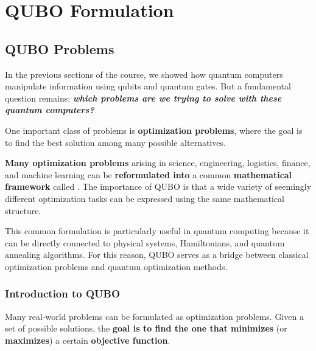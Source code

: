 \section{QUBO Formulation}\label{sec:qubo-formulation}

\subsection{QUBO Problems}\label{sec:qubo-problems}

In the previous sections of the course, we showed how quantum computers manipulate information using qubits and quantum gates. But a fundamental question remains: \emph{\textbf{which problems are we trying to solve with these quantum computers?}}

\highspace
One important class of problems is \textbf{optimization problems}, where the goal is to find the best solution among many possible alternatives.

\highspace
\textbf{Many optimization problems} arising in science, engineering, logistics, finance, and machine learning can be \textbf{reformulated into} a common \textbf{mathematical framework} called . The importance of QUBO is that a wide variety of seemingly different optimization tasks can be expressed using the same mathematical structure.

\highspace
This common formulation is particularly useful in quantum computing because it can be directly connected to physical systems, Hamiltonians, and quantum annealing algorithms. For this reason, QUBO serves as a bridge between classical optimization problems and quantum optimization methods.

\longline

\subsubsection{Introduction to QUBO}\label{sec:introduction-to-qubo}

Many real-world problems can be formulated as optimization problems. Given a set of possible solutions, the \textbf{goal is to find the one that minimizes} (or \textbf{maximizes}) a certain \textbf{objective function}.

